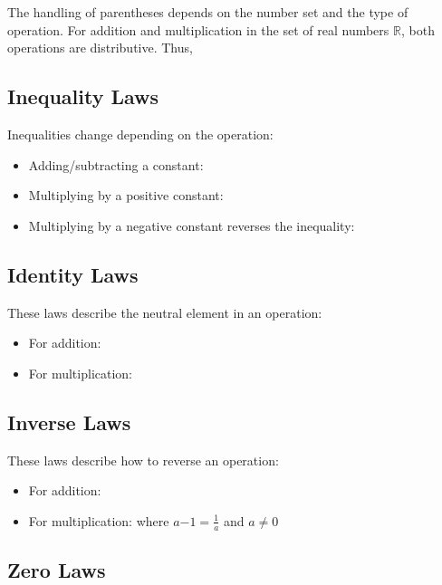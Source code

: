 The handling of parentheses depends on the number set and the type of operation. For addition and multiplication in the set of real numbers $\mathbb{R}$, both operations are distributive. Thus, 

\subsection{Inequality Laws}\label{Inequality Laws}

Inequalities change depending on the operation:
\begin{itemize} \item Adding/subtracting a constant:  \item Multiplying by a positive constant:  \item Multiplying by a negative constant reverses the inequality:  \end{itemize}

\subsection{Identity Laws}\label{Identity Laws}

These laws describe the neutral element in an operation:
\begin{itemize} \item For addition:  \item For multiplication:  \end{itemize}

\subsection{Inverse Laws}\label{Inverse Laws}

These laws describe how to reverse an operation:
\begin{itemize} \item For addition:  \item For multiplication:  where 
$a{-1} = \frac{1}{a}$ and $a \neq 0$
\end{itemize}

\subsection{Zero Laws}\label{Zero Laws}

